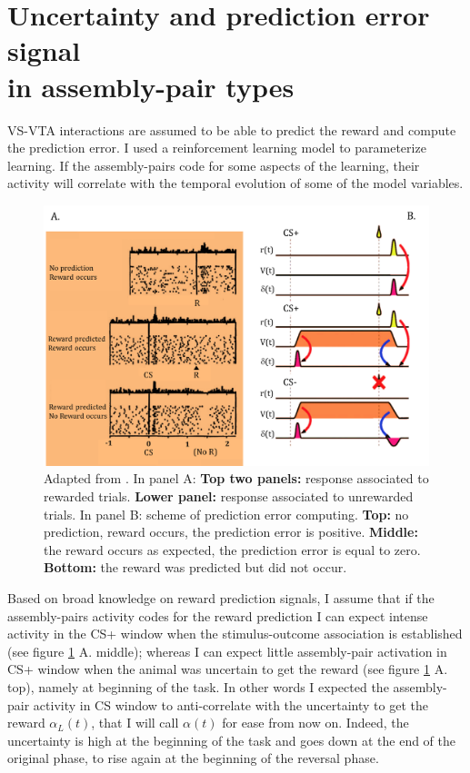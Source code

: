 \section{Uncertainty and prediction error signal\\in assembly-pair types}
\label{sec:CorrRL}
VS-VTA interactions are assumed to be able to predict the reward and compute the prediction error. I used a reinforcement learning model to parameterize learning. If the assembly-pairs code for some aspects of the learning, their activity will correlate with the temporal evolution of some of the model variables.
\begin{figure}
    \centering
    \includegraphics[scale=0.5]{figures/RewardDoyaRLSUM.png}
    \caption{Adapted from \cite{Doya}. In panel A: \textbf{Top two panels:} response associated to rewarded trials. \textbf{Lower panel:} response associated to unrewarded trials. In panel B: scheme of prediction error computing. \textbf{Top:} no prediction, reward occurs, the prediction error is positive. \textbf{Middle:} the reward occurs as expected, the prediction error is equal to zero. \textbf{Bottom:} the reward was predicted but did not occur.}
    \label{fig:RewDoyaSum}
\end{figure}
Based on broad knowledge on reward prediction signals, I assume that if the assembly-pairs activity codes for the reward prediction I can expect intense activity in the CS+ window when the stimulus-outcome association is established (see figure \ref{fig:RewDoyaSum} A. middle); whereas I can expect little assembly-pair activation in CS+ window when the animal was uncertain to get the reward (see figure \ref{fig:RewDoyaSum} A. top), namely at beginning of the task. In other words I expected the assembly-pair activity in CS window to anti-correlate with the uncertainty to get the reward $\alpha_L(t)$, that I will call $\alpha(t)$ for ease from now on. Indeed, the uncertainty is high at the beginning of the task and goes down at the end of the original phase, to rise again at the beginning of the reversal phase. 
